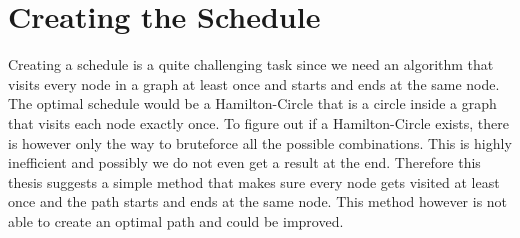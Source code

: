 \section{Creating the Schedule}
Creating a schedule is a quite challenging task since we need an algorithm that visits every node in a graph at least once and starts and ends at the same node. The optimal schedule would be a Hamilton-Circle that is a circle inside a graph that visits each node exactly once. To figure out if a Hamilton-Circle exists, there is however only the way to bruteforce all the possible combinations. This is highly inefficient and possibly we do not even get a result at the end. Therefore this thesis suggests a simple method that makes sure every node gets visited at least once and the path starts and ends at the same node. This method however is not able to create an optimal path and could be improved.

